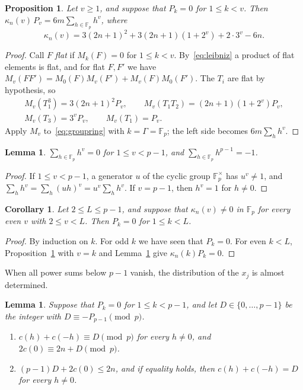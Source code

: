 \documentclass{amsart}
\newtheorem{lemma}[theorem]{Lemma}
\newtheorem{proposition}[theorem]{Proposition}
\newtheorem{corollary}[theorem]{Corollary}
\theoremstyle{definition}
\theoremstyle{remark}
\numberwithin{equation}{section}
\newcommand{\F}{\mathbb{F}}
\begin{document}
\begin{proposition}\label{prop:moment}
Let $v\ge1$, and suppose that $P_k=0$ for $1\le k<v$. Then $\kappa_n(v)\,P_v=6m\sum_{h\in\F_p}h^v$, where
\[
\kappa_n(v)=3(2n+1)^2+3(2n+1)(1+2^v)+2\cdot3^v-6n.
\]
\end{proposition}

\begin{proof}
Call $F$ \emph{flat} if $M_k(F)=0$ for $1\le k<v$. By~\eqref{eq:leibniz} a product of flat elements is flat, and for flat $F,F'$ we have $M_v(FF')=M_0(F)M_v(F')+M_v(F)M_0(F')$. The $T_i$ are flat by hypothesis, so
\begin{gather*}
M_v(T_1^3)=3(2n+1)^2P_v,\qquad M_v(T_1T_2)=(2n+1)(1+2^v)P_v,\\
M_v(T_3)=3^vP_v,\qquad M_v(T_1)=P_v.
\end{gather*}
Apply $M_v$ to~\eqref{eq:groupring} with $k=\Gamma=\F_p$; the left side becomes $6m\sum_hh^v$.
\end{proof}

\begin{lemma}\label{lem:powersums}
$\sum_{h\in\F_p}h^v=0$ for $1\le v<p-1$, and $\sum_{h\in\F_p}h^{p-1}=-1$.
\end{lemma}

\begin{proof}
If $1\le v<p-1$, a generator $u$ of the cyclic group $\F_p^\times$ has $u^v\ne1$, and $\sum_hh^v=\sum_h(uh)^v=u^v\sum_hh^v$. If $v=p-1$, then $h^v=1$ for $h\ne0$.
\end{proof}

\begin{corollary}\label{cor:flat}
Let $2\le L\le p-1$, and suppose that $\kappa_n(v)\ne0$ in $\F_p$ for every even $v$ with $2\le v<L$. Then $P_k=0$ for $1\le k<L$.
\end{corollary}

\begin{proof}
By induction on $k$. For odd $k$ we have seen that $P_k=0$. For even $k<L$, Proposition~\ref{prop:moment} with $v=k$ and Lemma~\ref{lem:powersums} give $\kappa_n(k)P_k=0$.
\end{proof}

When all power sums below $p-1$ vanish, the distribution of the $x_j$ is almost determined.

\begin{lemma}\label{lem:counts}
Suppose that $P_k=0$ for $1\le k<p-1$, and let $D\in\{0,\dots,p-1\}$ be the integer with $D\equiv-P_{p-1}\pmod p$.
\begin{enumerate}
\item $c(h)+c(-h)\equiv D\pmod p$ for every $h\ne0$, and $2c(0)\equiv2n+D\pmod p$.
\item $(p-1)D+2c(0)\le2n$, and if equality holds, then $c(h)+c(-h)=D$ for every $h\ne0$.
\end{enumerate}
\end{lemma}
\end{document}
